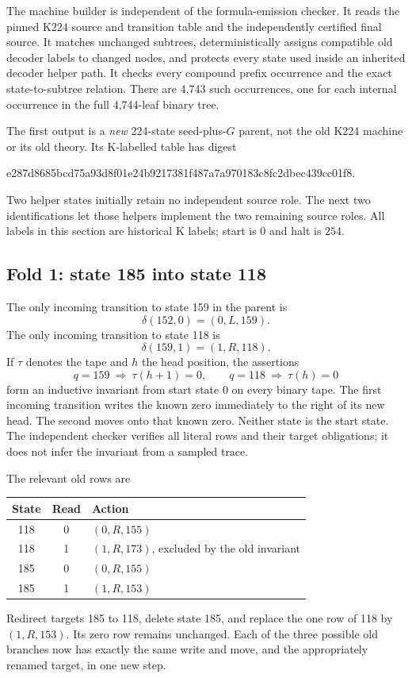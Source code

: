 The machine builder is independent of the formula-emission checker.
It reads the pinned K224 source and transition table and the independently
certified final source. It matches unchanged subtrees, deterministically
assigns compatible old decoder labels to changed nodes, and protects
every state used inside an inherited decoder helper path. It checks
every compound prefix occurrence and the exact state-to-subtree relation.
There are 4,743 such occurrences, one for each internal occurrence in
the full 4,744-leaf binary tree.

The first output is a \emph{new} 224-state seed-plus-$G$ parent, not
the old K224 machine or its old theory. Its K-labelled table has digest
\begin{center}\small\ttfamily
e287d8685bcd75a93d8f01e24b9217381f487a7a970183c8fc2dbec439cc01f8.
\end{center}
Two helper states initially retain no independent source role. The next
two identifications let those helpers implement the two remaining
source roles. All labels in this section are historical K labels; start
is $0$ and halt is $254$.

\subsection{Fold 1: state 185 into state 118}

The only incoming transition to state 159 in the parent is
\[
       \delta(152,0)=(0,L,159).
\]
The only incoming transition to state 118 is
\[
       \delta(159,1)=(1,R,118).
\]
If $\tau$ denotes the tape and $h$ the head position, the assertions
\begin{equation}
 q=159\ \Longrightarrow\ \tau(h+1)=0,
 \qquad q=118\ \Longrightarrow\ \tau(h)=0
 \label{eq:foldinv}
\end{equation}
form an inductive invariant from start state $0$ on every binary tape.
The first incoming transition writes the known zero immediately to the
right of its new head. The second moves onto that known zero. Neither
state is the start state. The independent checker verifies all literal
rows and their target obligations; it does not infer the invariant from
a sampled trace.

The relevant old rows are
\begin{center}
\begin{tabular}{ccl}
\toprule
State & Read & Action\\
\midrule
118 & 0 & $(0,R,155)$\\
118 & 1 & $(1,R,173)$, excluded by the old invariant\\
185 & 0 & $(0,R,155)$\\
185 & 1 & $(1,R,153)$\\
\bottomrule
\end{tabular}
\end{center}
Redirect targets 185 to 118, delete state 185, and replace the one row
of 118 by $(1,R,153)$. Its zero row remains unchanged. Each of the
three possible old branches now has exactly the same write and move,
and the appropriately renamed target, in one new step.


